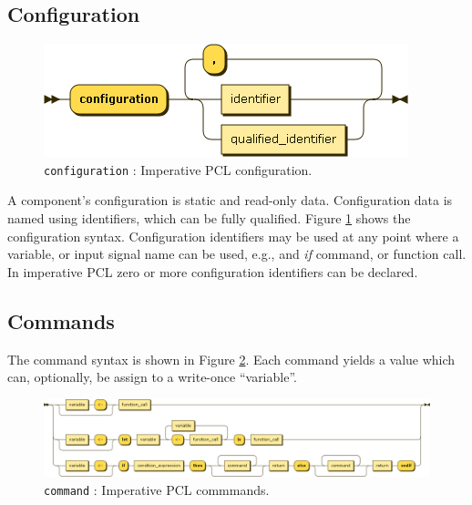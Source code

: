 \subsection{Configuration}
\begin{figure}[h!]
  \centering
    \includegraphics[scale=\DiagramScale]{chapters/adapter/diagrams/configuration}
  \caption{\texttt{configuration} : Imperative PCL configuration.}
  \label{fig:imperative-pcl-config}
\end{figure}
A component's configuration is static and read-only data. Configuration data is named using identifiers, which can be fully qualified. Figure \ref{fig:imperative-pcl-config} shows the configuration syntax. Configuration identifiers may be used at any point where a variable, or input signal name can be used, e.g., and \emph{if} command, or function call. In imperative PCL zero or more configuration identifiers can be declared.

\subsection{Commands}
The command syntax is shown in Figure \ref{fig:imperative-pcl-command}. Each command yields a value which can, optionally, be assign to a write-once ``variable''. 
\begin{figure}[h!]
  \centering
    \includegraphics[scale=0.45,angle=90]{chapters/adapter/diagrams/command}
  \caption{\texttt{command} : Imperative PCL commmands.}
  \label{fig:imperative-pcl-command}
\end{figure}

